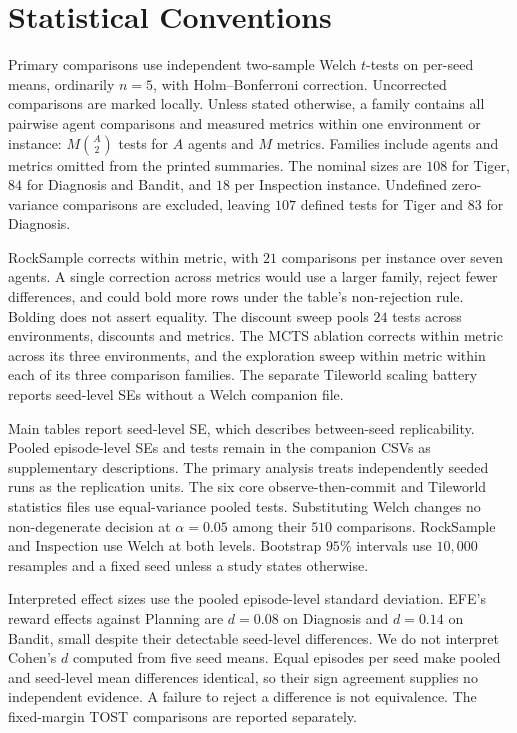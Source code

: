 \documentclass[runningheads]{llncs}
\begin{document}
\FloatBarrier

\section{Statistical Conventions}
\label{app:stats}

Primary comparisons use independent two-sample Welch $t$-tests on per-seed means, ordinarily $n=5$, with Holm--Bonferroni correction. Uncorrected comparisons are marked locally. Unless stated otherwise, a family contains all pairwise agent comparisons and measured metrics within one environment or instance: $M\binom{A}{2}$ tests for $A$ agents and $M$ metrics. Families include agents and metrics omitted from the printed summaries. The nominal sizes are $108$ for Tiger, $84$ for Diagnosis and Bandit, and $18$ per Inspection instance. Undefined zero-variance comparisons are excluded, leaving $107$ defined tests for Tiger and $83$ for Diagnosis.

RockSample corrects within metric, with $21$ comparisons per instance over seven agents. A single correction across metrics would use a larger family, reject fewer differences, and could bold more rows under the table's non-rejection rule. Bolding does not assert equality. The discount sweep pools $24$ tests across environments, discounts and metrics. The MCTS ablation corrects within metric across its three environments, and the exploration sweep within metric within each of its three comparison families. The separate Tileworld scaling battery reports seed-level SEs without a Welch companion file.

Main tables report seed-level SE, which describes between-seed replicability. Pooled episode-level SEs and tests remain in the companion CSVs as supplementary descriptions. The primary analysis treats independently seeded runs as the replication units. The six core observe-then-commit and Tileworld statistics files use equal-variance pooled tests. Substituting Welch changes no non-degenerate decision at $\alpha=0.05$ among their $510$ comparisons. RockSample and Inspection use Welch at both levels. Bootstrap $95\%$ intervals use $10{,}000$ resamples and a fixed seed unless a study states otherwise.

Interpreted effect sizes use the pooled episode-level standard deviation. EFE's reward effects against Planning are $d=0.08$ on Diagnosis and $d=0.14$ on Bandit, small despite their detectable seed-level differences. We do not interpret Cohen's $d$ computed from five seed means. Equal episodes per seed make pooled and seed-level mean differences identical, so their sign agreement supplies no independent evidence. A failure to reject a difference is not equivalence. The fixed-margin TOST comparisons are reported separately.
\end{document}
